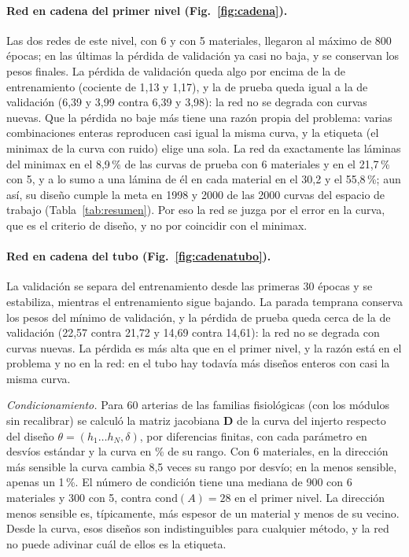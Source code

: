 \paragraph{Red en cadena del primer nivel (Fig.~\ref{fig:cadena}).} Las dos redes de este nivel, con 6 y con 5 materiales, llegaron al máximo de 800 épocas; en las últimas la pérdida de validación ya casi no baja, y se conservan los pesos finales. La pérdida de validación queda algo por encima de la de entrenamiento (cociente de 1,13 y 1,17), y la de prueba queda igual a la de validación (6,39 y 3,99 contra 6,39 y 3,98): la red no se degrada con curvas nuevas. Que la pérdida no baje más tiene una razón propia del problema: varias combinaciones enteras reproducen casi igual la misma curva, y la etiqueta (el minimax de la curva con ruido) elige una sola. La red da exactamente las láminas del minimax en el 8,9\,\% de las curvas de prueba con 6 materiales y en el 21,7\,\% con 5, y a lo sumo a una lámina de él en cada material en el 30,2 y el 55,8\,\%; aun así, su diseño cumple la meta en 1998 y 2000 de las 2000 curvas del espacio de trabajo (Tabla~\ref{tab:resumen}). Por eso la red se juzga por el error en la curva, que es el criterio de diseño, y no por coincidir con el minimax.

\paragraph{Red en cadena del tubo (Fig.~\ref{fig:cadenatubo}).} La validación se separa del entrenamiento desde las primeras 30 épocas y se estabiliza, mientras el entrenamiento sigue bajando. La parada temprana conserva los pesos del mínimo de validación, y la pérdida de prueba queda cerca de la de validación (22,57 contra 21,72 y 14,69 contra 14,61): la red no se degrada con curvas nuevas. La pérdida es más alta que en el primer nivel, y la razón está en el problema y no en la red: en el tubo hay todavía más diseños enteros con casi la misma curva.

\emph{Condicionamiento.} Para 60 arterias de las familias fisiológicas (con los módulos sin recalibrar) se calculó la matriz jacobiana $\mathbf{D}$ de la curva del injerto respecto del diseño $\theta=(h_1\ldots h_N,\delta)$, por diferencias finitas, con cada parámetro en desvíos estándar y la curva en \% de su rango. Con 6 materiales, en la dirección más sensible la curva cambia 8,5 veces su rango por desvío; en la menos sensible, apenas un 1\,\%. El número de condición tiene una mediana de 900 con 6 materiales y 300 con 5, contra $\mathrm{cond}(A)=28$ en el primer nivel. La dirección menos sensible es, típicamente, más espesor de un material y menos de su vecino. Desde la curva, esos diseños son indistinguibles para cualquier método, y la red no puede adivinar cuál de ellos es la etiqueta.

